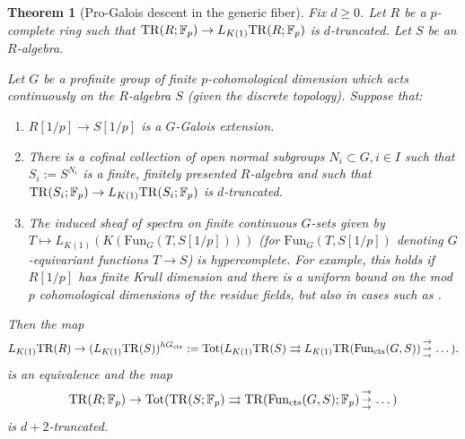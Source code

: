 \documentclass{amsart}
\newcommand{\triplearrows}{\begin{smallmatrix} \to \\ \to \\ 
\to \end{smallmatrix} }
\newtheorem{theorem}{Theorem}[section]
\theoremstyle{definition}
\begin{document}
\begin{theorem}[Pro-Galois descent in the generic fiber] 
\label{progaldesc}
Fix $d \geq 0$. 
Let $R$ be a $p$-complete ring such that $\mathrm{TR}(R; \mathbb{F}_p) \to L_{K(1)} \mathrm{TR}(R;
\mathbb{F}_p)$ is $d$-truncated. 
Let $S$ be an $R$-algebra. 


Let $G$ be a profinite group of finite $p$-cohomological dimension which acts
continuously on
the $R$-algebra $S$  (given the discrete topology). 
Suppose that: 
\begin{enumerate}
\item $R[1/p] \to S[1/p]$ is a $G$-Galois extension. 
\item There is a cofinal collection of open normal subgroups $N_i \subset G, i
\in I$ such that $S_i := S^{N_i}$ is 
a finite, finitely presented $R$-algebra
and such that 
$\mathrm{TR}(S_i; \mathbb{F}_p) \to L_{K(1)} \mathrm{TR}(S_i; \mathbb{F}_p)$ is $d$-truncated. 
\item 
The induced 
sheaf of spectra
on 
finite continuous $G$-sets given by $T \mapsto L_{K(1)} ( K( \mathrm{Fun}_G(T,
S[1/p])))$ 
(for $\mathrm{Fun}_G(T, S[1/p])$ denoting $G$-equivariant functions $T \to S$)
is hypercomplete. 
For example, this holds if $R[1/p]$ has finite Krull dimension
and there is a uniform bound on the mod $p$ cohomological dimensions of the
residue fields, but also in cases such as . 
\end{enumerate}
Then
the map 
\begin{equation} L_{K(1)}\TR(R) \to (L_{K(1)}\TR(S))^{h
G_{\mathrm{cts}}} := \mathrm{Tot}( 
L_{K(1)} \TR(S) \rightrightarrows L_{K(1)} \TR( \mathrm{Fun}_{\mathrm{cts}}(G,
S)) \triplearrows \dots ). \label{RSequiv} \end{equation}
is an equivalence
and the map 
$$ \TR(R; \mathbb{F}_p) \to \mathrm{Tot}( \TR(S; \mathbb{F}_p) \rightrightarrows \TR(
\mathrm{Fun}_{\mathrm{cts}}(G, S); \mathbb{F}_p) \triplearrows \dots ) $$
is $d+2$-truncated. 

\end{theorem} 
\end{document}
